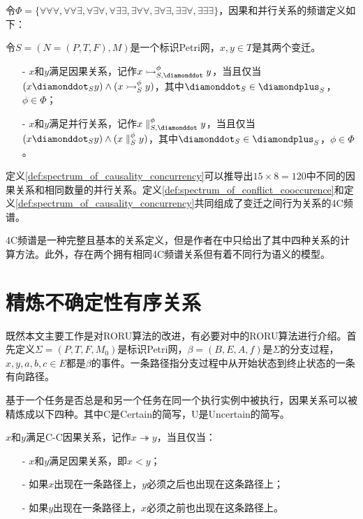 令$\Phi=\{\forall\forall\forall,\forall\forall\exists,\forall\exists\forall,\forall\exists\exists,\exists\forall\forall,\exists\forall\exists,\exists\exists\forall,\exists\exists\exists\}$，因果和并行关系的频谱定义如下：
\begin{definition}[因果和并行关系的频谱]\label{def:spectrum_of_causality_concurrency}
令$S=(N=(P,T,F),M)$是一个标识Petri网，$x,y\in T$是其两个变迁。
  \begin{itemize}
    \item[-] $x$和$y$满足因果关系，记作$x\rightarrowtail_{S,\diamonddot}^{\phi}y$，当且仅当\\
    $(x\diamonddot_{S}y)\wedge(x\rightarrowtail_{S}^{\phi}y)$，其中$\diamonddot_{S}\in\diamondplus_{S}$，$\phi\in\Phi$；
    \item[-] $x$和$y$满足并行关系，记作$x\parallel_{S,\diamonddot}^{\phi}y$，当且仅当\\
    $(x\diamonddot_{S}y)\wedge(x\parallel_{S}^{\phi}y)$，其中$\diamonddot_{S}\in\diamondplus_{S}$，$\phi\in\Phi$。
  \end{itemize}
\end{definition}
定义\ref{def:spectrum_of_causality_concurrency}可以推导出$15\times 8=120$中不同的因果关系和相同数量的并行关系。定义\ref{def:spectrum_of_conflict_cooccurence}和定义\ref{def:spectrum_of_causality_concurrency}共同组成了变迁之间行为关系的4C频谱。

4C频谱是一种完整且基本的关系定义，但是作者在中只给出了其中四种关系的计算方法。此外，存在两个拥有相同4C频谱关系但有着不同行为语义的模型\cite{armas2014suitability}。

\section{精炼不确定性有序关系}\label{sec:roru}
既然本文主要工作是对RORU算法的改进，有必要对中的RORU算法进行介绍。首先定义$\Sigma=(P,T,F,M_{0})$是标识Petri网，$\beta=(B,E,A,f)$是$\Sigma$的分支过程，$x,y,a,b,c\in E$都是$\beta$的事件。一条路径指分支过程中从开始状态到终止状态的一条有向路径。

基于一个任务是否总是和另一个任务在同一个执行实例中被执行，因果关系可以被精炼成以下四种。其中C是Certain的简写，U是Uncertain的简写。

\begin{definition}\label{def:c_c_causal}
$x$和$y$满足C-C因果关系，记作$x\twoheadrightarrow y$，当且仅当：
  \begin{itemize}
    \item[-] $x$和$y$满足因果关系，即$x<y$；
    \item[-] 如果$x$出现在一条路径上，$y$必须之后也出现在这条路径上；
    \item[-] 如果$y$出现在一条路径上，$x$必须之前也出现在这条路径上。
  \end{itemize}
\end{definition}

